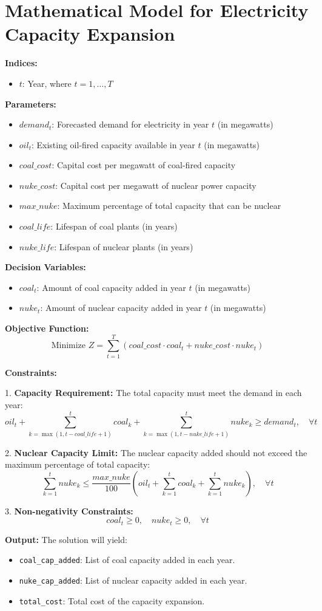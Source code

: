 \documentclass{article}
\begin{document}
\section*{Mathematical Model for Electricity Capacity Expansion}

\textbf{Indices:}
\begin{itemize}
    \item $t$: Year, where $t = 1, \ldots, T$
\end{itemize}

\textbf{Parameters:}
\begin{itemize}
    \item $demand_t$: Forecasted demand for electricity in year $t$ (in megawatts)
    \item $oil_t$: Existing oil-fired capacity available in year $t$ (in megawatts)
    \item $coal\_cost$: Capital cost per megawatt of coal-fired capacity
    \item $nuke\_cost$: Capital cost per megawatt of nuclear power capacity
    \item $max\_nuke$: Maximum percentage of total capacity that can be nuclear
    \item $coal\_life$: Lifespan of coal plants (in years)
    \item $nuke\_life$: Lifespan of nuclear plants (in years)
\end{itemize}

\textbf{Decision Variables:}
\begin{itemize}
    \item $coal_t$: Amount of coal capacity added in year $t$ (in megawatts)
    \item $nuke_t$: Amount of nuclear capacity added in year $t$ (in megawatts)
\end{itemize}

\textbf{Objective Function:}
\[
\text{Minimize } Z = \sum_{t=1}^{T} (coal\_cost \cdot coal_t + nuke\_cost \cdot nuke_t)
\]

\textbf{Constraints:}

1. \textbf{Capacity Requirement:} The total capacity must meet the demand in each year:
\[
oil_t + \sum_{k=\max(1, t-coal\_life+1)}^{t} coal_k + \sum_{k=\max(1, t-nuke\_life+1)}^{t} nuke_k \geq demand_t, \quad \forall t
\]

2. \textbf{Nuclear Capacity Limit:} The nuclear capacity added should not exceed the maximum percentage of total capacity:
\[
\sum_{k=1}^{t} nuke_k \leq \frac{max\_nuke}{100} \left( oil_t + \sum_{k=1}^{t} coal_k + \sum_{k=1}^{t} nuke_k \right), \quad \forall t
\]

3. \textbf{Non-negativity Constraints:}
\[
coal_t \geq 0, \quad nuke_t \geq 0, \quad \forall t
\]

\textbf{Output:} 
The solution will yield:
\begin{itemize}
    \item \texttt{coal\_cap\_added}: List of coal capacity added in each year.
    \item \texttt{nuke\_cap\_added}: List of nuclear capacity added in each year.
    \item \texttt{total\_cost}: Total cost of the capacity expansion.
\end{itemize}
\end{document}
